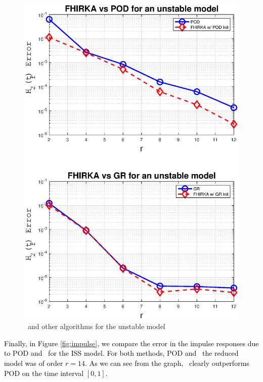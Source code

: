 \documentclass[twocolumn]{autart}
\begin{document}
  \begin{figure}[H]
 \centering
   \includegraphics [scale=0.35]{fig3u}
      \caption{\FH \ and other algorithms for the unstable model \label{fig:uns}}
 \end{figure}
 
\textcolor{black}{Finally, in Figure \ref{fig:impulse}, we compare the error in the impulse responses due to POD and \FH \ for the ISS model. For both methods, POD and \FH\  the reduced model was of order $r=14$. As we can see from the graph, \FH \ clearly outperforms POD on the time interval $[0, 1]$.}
\end{document}
